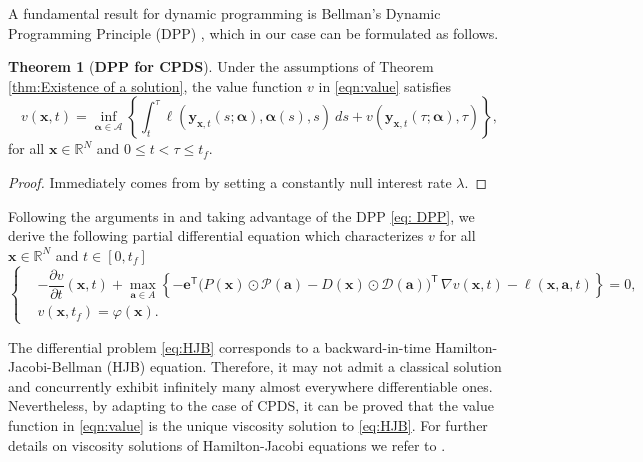 \documentclass[10pt]{article}
\theoremstyle{remark}
\newcommand{\R}{\mathbb{R}}
\newcommand{\A}{\mathcal{A}}
\newcommand{\tpose}{^\mathsf{T}}
\theoremstyle{definition}
\newtheorem{thm}{Theorem}
\theoremstyle{remark}
\begin{document}
A fundamental result for dynamic programming is Bellman's Dynamic Programming Principle (DPP) \cite{Bellman1957, FalconeFerretti}, which in our case can be formulated as follows.
\begin{thm}[\textbf{DPP for CPDS}] \label{thm:DPP}
Under the assumptions of Theorem \ref{thm:Existence of a solution}, the value function $v$ in \eqref{eqn:value} satisfies
\begin{equation}\label{eq: DPP}
    v(\bm{x},t) = \inf_{\bm{\alpha} \in \A} \left\{ \int_t^\tau \ell(\bm{y}_{\bm{x},t} (s; \bm{\alpha}),\bm{\alpha}(s),s)\ ds + v(\bm{y}_{\bm{x},t} (\tau; \bm{\alpha}),\tau) \right\},
\end{equation}
for all $\bm{x} \in \R^N$ and $0 \leq t< \tau \leq t_f$.
\end{thm}
\begin{proof} 
Immediately comes from \cite[Proposition 3.2]{BardiCapuzzoDocetta2008} by setting a constantly null interest rate $\lambda.$
\end{proof}
Following the arguments in \cite{Bellman1957, BardiCapuzzoDocetta2008} and taking advantage of the DPP \eqref{eq: DPP}, we derive the following partial differential equation which characterizes $v$ for all $\bm{x} \in \R^N$ and $t \in [0, t_f]$
\begin{equation} \label{eq:HJB} 
\left\{
\begin{aligned}
&- \dfrac{\partial v}{\partial t}(\bm{x},t) +\max\limits_{\bm{a} \in A} \left\{ - \bm{e}\tpose \big(P(\bm{x})\odot \mathcal{P}(\bm{a}) - D(\bm{x})\odot \mathcal{D}(\bm{a}) \big)\tpose \,  \nabla v (\bm{x},t) -\ell(\bm{x},\bm{a},t) \right\}=0, \\
&v(\bm{x},t_f)=\varphi(\bm{x}).
\end{aligned}
\right.
\end{equation}

The differential problem \eqref{eq:HJB} corresponds to a backward-in-time Hamilton-Jacobi-Bellman (HJB) equation. Therefore, it may not admit a classical solution and concurrently exhibit infinitely many almost everywhere differentiable ones. Nevertheless, by adapting \cite[Section 10.3, Theorem 2]{Evans1998} to the case of CPDS, it can be proved that the value function in \eqref{eqn:value} is the unique viscosity solution to \eqref{eq:HJB}. For further details on viscosity solutions of Hamilton-Jacobi equations we refer to \cite{CrandallLions1983, CrandallEvansLions1984}.
\end{document}
